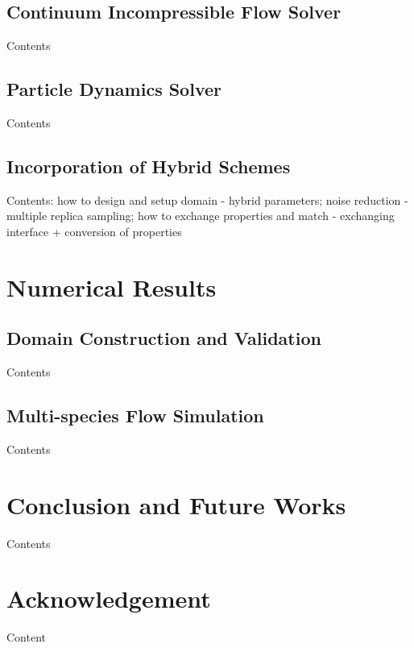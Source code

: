 \documentclass[]{aiaa-tc}%
\begin{document}
\subsection{Continuum Incompressible Flow Solver}
\label{sec:numerics_cfd}

Contents

\subsection{Particle Dynamics Solver}
\label{sec:numerics_md}

Contents

\subsection{Incorporation of Hybrid Schemes}
\label{sec:numerics_hybrid}

Contents: how to design and setup domain - hybrid parameters; noise reduction - multiple replica sampling; how to exchange properties and match - exchanging interface + conversion of properties



\section{Numerical Results}
\label{sec:result}

\subsection{Domain Construction and Validation}
\label{sec:result_val}

Contents

\subsection{Multi-species Flow Simulation}
\label{sec:result_multi}

Contents


\section{Conclusion and Future Works}
\label{sec:conclusion}

Contents


\section*{Acknowledgement}

Content





\end{document}
